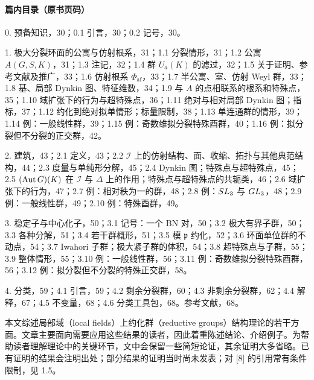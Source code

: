 \paragraph*{篇内目录（原书页码）}
0. 预备知识，30；0.1 引言，30；0.2 记号，30。

1. 极大分裂环面的公寓与仿射根系，31；1.1 分裂情形，31；1.2 公寓 $A(G,S,K)$，31；1.3 注记，32；1.4 群 $U_a(K)$ 的滤过，32；1.5 关于证明、参考文献及推广，33；1.6 仿射根系 $\Phi_{\mathrm{af}}$，33；1.7 半公寓、室、仿射 Weyl 群，33；1.8 基、局部 Dynkin 图、特征维数，34；1.9 与 $A$ 的点相联系的根系和特殊点，35；1.10 域扩张下的行为与超特殊点，36；1.11 绝对与相对局部 Dynkin 图；指标，37；1.12 约化到绝对拟单情形；标量限制，38；1.13 单连通群的情形，39；1.14 例：一般线性群，39；1.15 例：奇数维拟分裂特殊酉群，40；1.16 例：拟分裂但不分裂的正交群，42。

2. 建筑，43；2.1 定义，43；2.2 $\mathscr I$ 上的仿射结构、面、收缩、拓扑与其他典范结构，44；2.3 度量与单纯形分解，45；2.4 Dynkin 图；特殊点与超特殊点，45；2.5 $(\operatorname{Aut} G)(K)$ 在 $\mathscr I$ 与 $\Delta$ 上的作用；特殊点与超特殊点的共轭类，46；2.6 域扩张下的行为，47；2.7 例：相对秩为一的群，48；2.8 例：$SL_3$ 与 $GL_3$，48；2.9 例：一般线性群，49；2.10 例：特殊酉群，49。

3. 稳定子与中心化子，50；3.1 记号：一个 BN 对，50；3.2 极大有界子群，50；3.3 各种分解，51；3.4 若干群概形，51；3.5 模 $\mathfrak p$ 约化，52；3.6 环面单位群的不动点，54；3.7 Iwahori 子群；极大紧子群的体积，54；3.8 超特殊点与子群，55；3.9 整体情形，55；3.10 例：一般线性群，56；3.11 例：奇数维拟分裂特殊酉群，56；3.12 例：拟分裂但不分裂的特殊正交群，58。

4. 分类，59；4.1 引言，59；4.2 剩余分裂群，60；4.3 非剩余分裂群，62；4.4 解释，67；4.5 不变量，68；4.6 分类工具包，68。参考文献，68。

本文综述局部域（local fields）上约化群（reductive groups）结构理论的若干方面。文章主要面向需要应用这些结果的读者，因此着重陈述结论、介绍例子。为帮助读者理解理论中的关键环节，文中会保留一些简短论证，其余证明大多省略。已有证明的结果会注明出处；部分结果的证明当时尚未发表；对 [8] 的引用常有条件限制，见 1.5。

